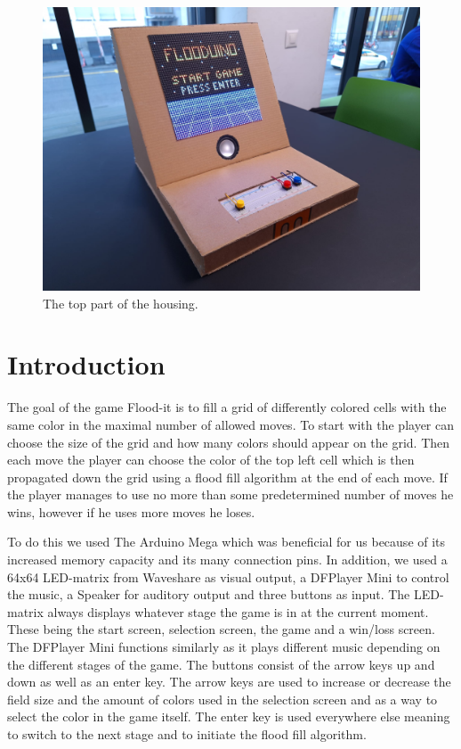 \documentclass[10pt, a4paper]{article}
\begin{document}
\begin{figure}[h]
\begin{minipage}{0.48\linewidth}
    \includegraphics[width=\linewidth]{top_part.jpg}
    \caption{The top part of the housing.}
    \end{minipage}
\end{figure}


\section*{Introduction}

The goal of the game Flood-it is to fill a grid of differently colored cells with the same color in the maximal number of allowed moves. To start with the player can choose the size of the grid and how many colors should appear on the grid. Then each move the player can choose the color of the top left cell which is then propagated down the grid using a flood fill algorithm at the end of each move. If the player manages to use no more than some predetermined number of moves he wins, however if he uses more moves he loses.

To do this we used The Arduino Mega which was beneficial for us because of its increased memory capacity and its many connection pins. In addition, we used a 64x64 LED-matrix from Waveshare as visual output, a DFPlayer Mini to control the music, a Speaker for auditory output and three buttons as input. The LED-matrix always displays whatever stage the game is in at the current moment. These being the start screen, selection screen, the game and a win/loss screen. The DFPlayer Mini functions similarly as it plays different music depending on the different stages of the game. The buttons consist of the arrow keys up and down as well as an enter key. The arrow keys are used to increase or decrease the field size and the amount of colors used in the selection screen and as a way to select the color in the game itself. The enter key is used everywhere else meaning to switch to the next stage and to initiate the flood fill algorithm.
\end{document}

